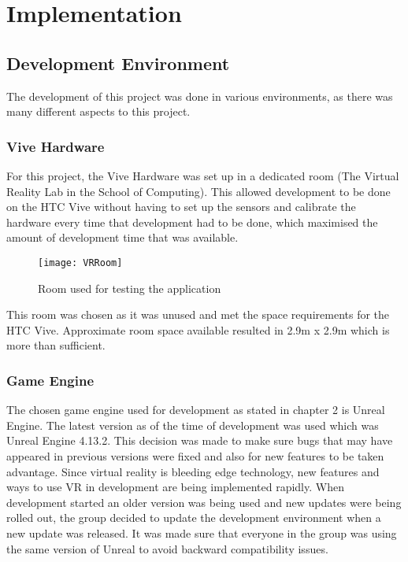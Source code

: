 \chapter{Implementation}
\label{chapter6}

\section{Development Environment}
The development of this project was done in various environments, as there was many different aspects to this project.

\subsection{Vive Hardware}
For this project, the Vive Hardware was set up in a dedicated room (The Virtual Reality Lab in the School of Computing). This allowed development to be done on the HTC Vive without having to set up the sensors and calibrate the hardware every time that development had to be done, which maximised the amount of development time that was available.

\begin{figure}[H]
	\texttt{[image: VRRoom]}
	\centering
	\caption{Room used for testing the application}
	\label{fig:VRRoom}
\end{figure}

This room was chosen as it was unused and met the space requirements for the HTC Vive. Approximate room space available resulted in 2.9m x 2.9m which is more than sufficient.

\subsection{Game Engine}
 The chosen game engine used for development as stated in chapter 2 is Unreal Engine. The latest version as of the time of development was used which was Unreal Engine 4.13.2. This decision was made to make sure bugs that may have appeared in previous versions were fixed and also for new features to be taken advantage. Since virtual reality is bleeding edge technology, new features and ways to use VR in development are being implemented rapidly. When development started an older version was being used and new updates were being rolled out, the group decided to update the development environment when a new update was released. It was made sure that everyone in the group was using the same version of Unreal to avoid backward compatibility issues.

